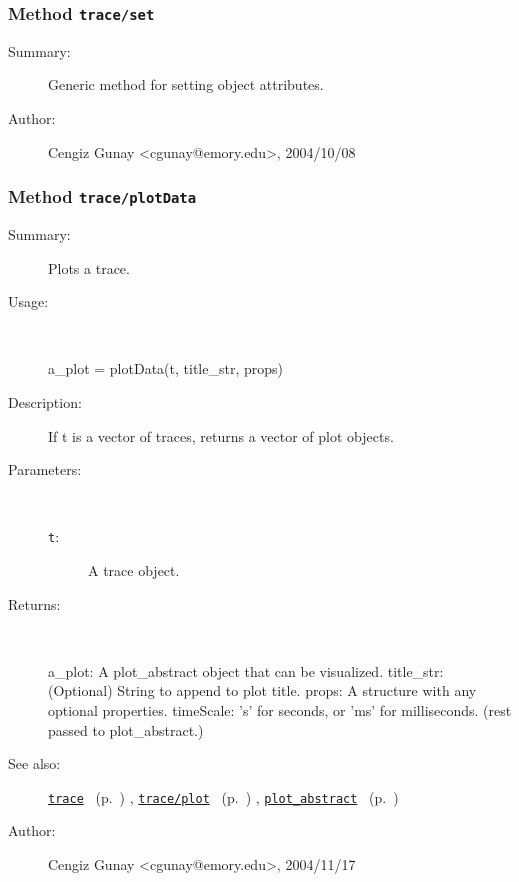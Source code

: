 \subsubsection[Method \texttt{set}]{Method \texttt{trace/set}}%
%
\label{ref_trace__set}%
\hypertarget{ref_trace__set}{}%
\begin{description}
\item[Summary:]Generic method for setting object attributes.
%
%
%
%
%
%
%
\item[Author:]%
Cengiz Gunay <cgunay@emory.edu>, 2004/10/08%
\end{description}
\methodline%
\subsubsection[Method \texttt{plotData}]{Method \texttt{trace/plotData}}%
%
\label{ref_trace__plotData}%
\hypertarget{ref_trace__plotData}{}%
\begin{description}
\item[Summary:]Plots a trace.
%
\item[Usage:]~%
\begin{lyxcode}%
a\_plot = plotData(t, title\_str, props)
%
\end{lyxcode}%
%
\item[Description:]%
If t is a vector of traces, returns a vector of plot objects.
\item[Parameters:]~
\begin{description}%
\item[\texttt{t}:]
 A trace object.
\end{description}%
%
\item[Returns:]~

	a\_plot: A plot\_abstract object that can be visualized.
	title\_str: (Optional) String to append to plot title.
	props: A structure with any optional properties.
	  timeScale: 's' for seconds, or 'ms' for milliseconds.
	  (rest passed to plot\_abstract.)
%
%
\item[See also:]%
\hyperlink{ref_trace}{\texttt{trace}}%
\ (p.~\pageref{ref_trace})%
%
, \hyperlink{ref_trace__plot}{\texttt{trace/plot}}%
\ (p.~\pageref{ref_trace__plot})%
%
, \hyperlink{ref_plot_abstract}{\texttt{plot\_abstract}}%
\ (p.~\pageref{ref_plot_abstract})%
%
%
\item[Author:]%
Cengiz Gunay <cgunay@emory.edu>, 2004/11/17%
\end{description}
\methodline%
